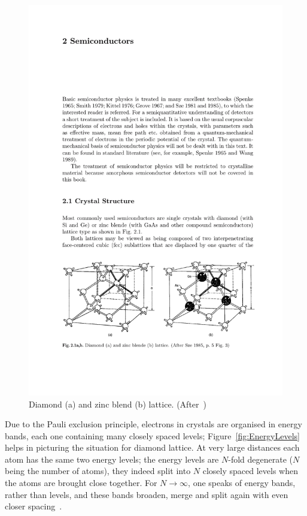 \begin{figure}[htbp]
   \centering
   \includegraphics{diamondLattice.pdf} %
   \caption{\label{fig:diamondLattice}Diamond (a) and zinc blend (b) lattice. (After~\cite{Lutz:411172})}
\end{figure}

Due to the Pauli exclusion principle, electrons in crystals are organised in energy bands, 
each one containing many closely spaced levels; Figure~\ref{fig:EnergyLevels} helps in picturing 
the situation for diamond lattice. At very large distances each atom has the same two energy levels; 
the energy levels are $N$-fold degenerate ($N$ being the number of atoms), they indeed split 
into $N$ closely spaced levels when the atoms are brought close together. 
For $N\to\infty$, one speaks of energy bands, rather than levels, and these bands broaden, merge 
and split again with even closer spacing~\cite{Lutz:411172}.

